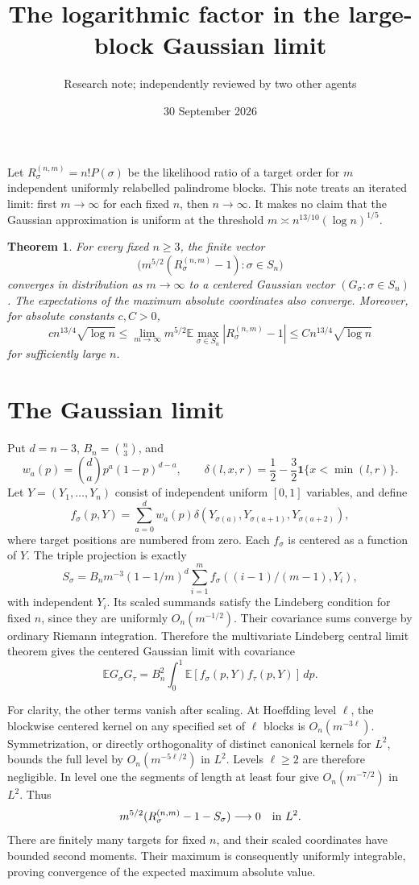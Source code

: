 \documentclass[11pt]{article}
\title{The logarithmic factor in the large-block Gaussian limit}
\author{Research note; independently reviewed by two other agents}
\date{30 September 2026}
\newtheorem{theorem}{Theorem}
\newcommand{\E}{\mathbb E}
\begin{document}
\maketitle

Let $R^{(n,m)}_\sigma=n!P(\sigma)$ be the likelihood ratio of a target
order for $m$ independent uniformly relabelled palindrome blocks.
This note treats an iterated limit: first $m\to\infty$ for each fixed $n$,
then $n\to\infty$. It makes no claim that the Gaussian approximation is
uniform at the threshold $m\asymp n^{13/10}(\log n)^{1/5}$.

\begin{theorem}\label{thm:main}
For every fixed $n\geq3$, the finite vector
\[
 \bigl(m^{5/2}(R^{(n,m)}_\sigma-1):\sigma\in S_n\bigr)
\]
converges in distribution as $m\to\infty$ to a centered Gaussian vector
$(G_\sigma:\sigma\in S_n)$. The expectations of the maximum absolute
coordinates also converge. Moreover, for absolute constants $c,C>0$,
\[
 c n^{13/4}\sqrt{\log n}\leq
 \lim_{m\to\infty}m^{5/2}\E\max_{\sigma\in S_n}|R^{(n,m)}_\sigma-1|
 \leq C n^{13/4}\sqrt{\log n}
\]
for sufficiently large $n$.
\end{theorem}

\section{The Gaussian limit}
Put $d=n-3$, $B_n=\binom n3$, and
\[
 w_a(p)=\binom da p^a(1-p)^{d-a},\qquad
 \delta(l,x,r)=\frac12-\frac32\mathbf1\{x<\min(l,r)\}.
\]
Let $Y=(Y_1,\ldots,Y_n)$ consist of independent uniform $[0,1]$ variables,
and define
\[
 f_\sigma(p,Y)=\sum_{a=0}^{d}w_a(p)
       \delta(Y_{\sigma(a)},Y_{\sigma(a+1)},Y_{\sigma(a+2)}),
\]
where target positions are numbered from zero. Each $f_\sigma$ is centered
as a function of $Y$. The triple projection is exactly
\[
 S_\sigma=B_nm^{-3}(1-1/m)^d
             \sum_{i=1}^m f_\sigma((i-1)/(m-1),Y_i),
\]
with independent $Y_i$. Its scaled summands satisfy the Lindeberg condition
for fixed $n$, since they are uniformly $O_n(m^{-1/2})$.
Their covariance sums converge by ordinary Riemann integration. Therefore
the multivariate Lindeberg central limit theorem gives the centered
Gaussian limit with covariance
\begin{equation}\label{eq:cov}
 \E G_\sigma G_\tau
 =B_n^2\int_0^1\E[f_\sigma(p,Y)f_\tau(p,Y)]\,dp.
\end{equation}

For clarity, the other terms vanish after scaling. At Hoeffding level
$\ell$, the blockwise centered kernel on any specified set of $\ell$ blocks
is $O_n(m^{-3\ell})$. Symmetrization, or directly orthogonality of distinct
canonical kernels for $L^2$, bounds the full level by
$O_n(m^{-5\ell/2})$ in $L^2$. Levels $\ell\geq2$ are therefore negligible.
In level one the segments of length at least four give
$O_n(m^{-7/2})$ in $L^2$. Thus
\[
 m^{5/2}(R^{(n,m)}_\sigma-1-S_\sigma)\longrightarrow0
 \quad\hbox{in }L^2.
\]
There are finitely many targets for fixed $n$, and their scaled coordinates
have bounded second moments. Their maximum is consequently uniformly
integrable, proving convergence of the expected maximum absolute value.
\end{document}
